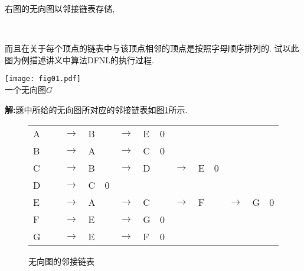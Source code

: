 \begin{problem}[习题2.6]右图的无向图以邻接链表存储,
\vspace{-2em}
\begin{multicols}{2}
~

而且在关于每个顶点的链表中与该顶点相邻的顶点是按照字母顺序排列的.
试以此图为例描述讲义中算法DFNL的执行过程.

\begin{center}
\texttt{[image: fig01.pdf]}\\
一个无向图$G$
\end{center}

\end{multicols}

\end{problem}
\begin{solution}
\textbf{解:}题中所给的无向图所对应的邻接链表如图\ref{link}所示.
\begin{figure}[!htb]
\centering
\begin{tabular}{l|l|l|l|l|l|l|l|llllll}
\cline{2-2}\cline{4-5}\cline{7-8}
A & { ~ } & $\rightarrow$ & B &  & $\rightarrow$ & E & 0 &  &  &  &  &  &  \\
\cline{2-2}\cline{4-5}\cline{7-8}
B &  & $\rightarrow$ & A &  & $\rightarrow$ & C & 0 &  &  &  &  &  &  \\
\cline{2-2}\cline{4-5}\cline{7-8}\cline{10-11}
C &  & $\rightarrow$ & B &  & $\rightarrow$ & D &  & \multicolumn{1}{l|}{$\rightarrow$} & \multicolumn{1}{l|}{E} & \multicolumn{1}{l|}{0} &  &  &  \\
\cline{2-2}\cline{4-5}\cline{7-8}\cline{10-11}
D &  & $\rightarrow$ & C & 0 & \multicolumn{1}{l}{} & \multicolumn{1}{l}{} & \multicolumn{1}{l}{} &  &  &  &  &  &  \\
\cline{2-2}\cline{4-5}\cline{7-8}\cline{10-11}\cline{13-14}
E &  & $\rightarrow$ & A &  & $\rightarrow$ & C &  & \multicolumn{1}{l|}{$\rightarrow$} & \multicolumn{1}{l|}{F} & \multicolumn{1}{l|}{} & \multicolumn{1}{l|}{$\rightarrow$} & \multicolumn{1}{l|}{G} & \multicolumn{1}{l|}{0} \\
\cline{2-2}\cline{4-5}\cline{7-8}\cline{10-11}\cline{13-14}
F &  & $\rightarrow$ & E &  & $\rightarrow$ & G & 0 &  &  &  &  &  &  \\
\cline{2-2}\cline{4-5}\cline{7-8}
G &  & $\rightarrow$ & E &  & $\rightarrow$ & F & 0 &  &  &  &  &  &  \\
\cline{2-2}\cline{4-5}\cline{7-8}
\end{tabular}
\caption{\label{link}无向图的邻接链表}
\end{figure}

\end{solution}
